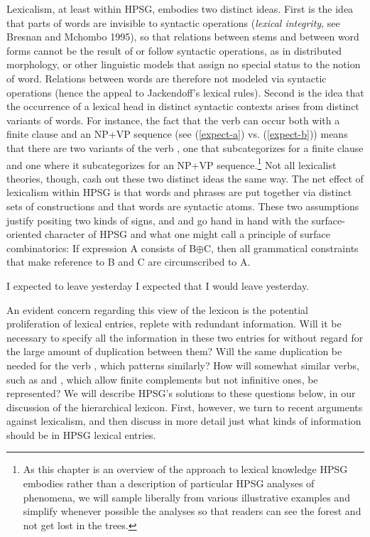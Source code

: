 \documentclass[output=paper]{langsci/langscibook}
\begin{document}
Lexicalism, at least within HPSG, embodies two distinct ideas. First is the idea that parts of words are invisible to syntactic operations (\emph{lexical integrity}, see Bresnan and Mchombo 1995), so that relations between stems and between word forms cannot be the result of or follow syntactic operations, as in distributed morphology, or other linguistic models that assign no special status to the notion of word. Relations between words are therefore not modeled via syntactic operations (hence the appeal to Jackendoff's lexical rules). Second is the idea that the occurrence of a lexical head in distinct syntactic contexts arises from distinct variants of words. For instance, the fact that the verb  can occur both with a finite clause and an NP+VP sequence (see (\ref{expect-a}) vs. (\ref{expect-b})) means that there are two variants of the verb , one that subcategorizes for a finite clause and one where it subcategorizes for an NP+VP sequence.\footnote{As this chapter is an overview of the approach to lexical knowledge HPSG embodies rather than a description of particular HPSG analyses of phenomena, we will sample liberally from various illustrative examples and simplify whenever possible the analyses so that readers can see the forest and not get lost in the trees.} Not all lexicalist theories, though, cash out these two distinct ideas the same way. The net effect of lexicalism within HPSG is that words and phrases are put together via distinct sets of constructions and that words are syntactic atoms. These two assumptions justify positing two kinds of signs,  and  and go hand in hand with the surface-oriented character of HPSG and what one might call a principle of surface combinatorics: If expression A consists of B$\oplus$C, then all grammatical constraints that make reference to B and C are circumscribed to A. 

\begin{exe}
\ex \label{expect-a} I expected to leave yesterday
\ex \label{expect-b} I expected that I would leave yesterday.
\end{exe}
 
An evident concern regarding this view of the lexicon is the potential proliferation of lexical entries, replete with redundant information.
Will it be necessary to specify all the information in these two entries for  without regard for the large amount of duplication between them?
Will the same duplication be needed for the verb  , which patterns similarly?
How will somewhat similar verbs, such as  and , which allow finite complements but not infinitive ones, be represented?
We will describe HPSG's solutions to these questions below, in our discussion of the hierarchical lexicon.
First, however, we turn to recent arguments against lexicalism, and then discuss in more detail just what kinds of information should be in HPSG lexical entries.
\end{document}
